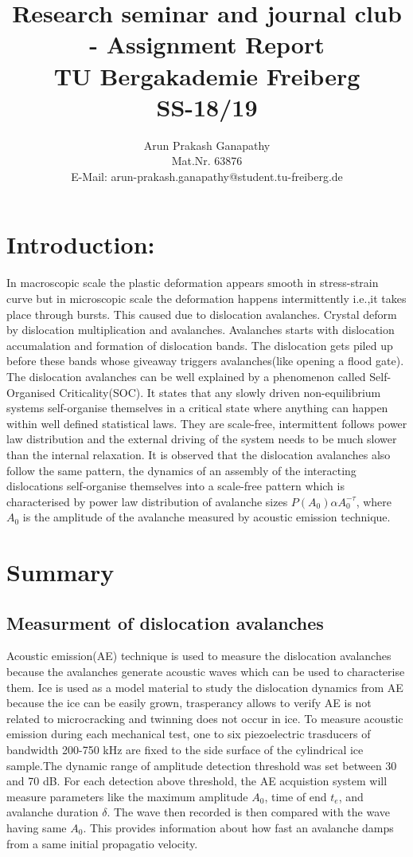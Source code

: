 \documentclass[a4paper,12pt]{article}
\title{\Huge{\textbf{Research seminar and journal club - Assignment Report}}\\[0.5em]\smaller \textbf{TU Bergakademie Freiberg\\SS-18/19}}
\author{Arun Prakash Ganapathy\\
\small{Mat.Nr. 63876}\\
\small{E-Mail: arun-prakash.ganapathy@student.tu-freiberg.de}
}
\date{}
\begin{document}
\maketitle
\newpage

\section{Introduction:}
\indent\indent In macroscopic scale the plastic deformation appears smooth in stress-strain curve but in microscopic scale the deformation happens intermittently i.e.,it takes place through bursts. This caused due to dislocation avalanches. Crystal deform by dislocation multiplication and avalanches. Avalanches starts with dislocation accumalation and formation of dislocation bands. The dislocation gets piled up before these bands whose giveaway triggers avalanches(like opening a flood gate). The dislocation avalanches can be well explained by a phenomenon called Self-Organised Criticality(SOC). It states that  any slowly driven non-equilibrium systems self-organise themselves in a critical state where anything can happen within well defined statistical laws. They are scale-free, intermittent follows power law distribution and the external driving of the system needs to be much slower than the internal relaxation. It is observed that the dislocation avalanches also follow the same pattern, the dynamics of an assembly of the interacting dislocations self-organise themselves into a scale-free pattern which is characterised by power law distribution of avalanche sizes $ P(A_0)  \alpha  A_0^{-\tau} $, where $ A_0 $ is the amplitude of the avalanche measured by acoustic emission technique.
\section{Summary}
\subsection{Measurment of dislocation avalanches}
\indent\indent Acoustic emission(AE) technique is used to measure the dislocation avalanches because the avalanches generate acoustic waves which can be used to characterise them. Ice is used as a model material to study the dislocation dynamics from AE because the ice can be easily grown, trasperancy allows to verify AE is not related to microcracking and twinning does not occur in ice. To measure acoustic emission during each mechanical test, one to six piezoelectric trasducers of bandwidth 200-750 kHz are fixed to the side surface of the cylindrical ice sample.The dynamic range of amplitude detection threshold was set between 30 and 70 dB. For each detection above threshold, the AE acquistion system will measure parameters like the maximum amplitude $A_0$, time of end $ t_e$, and avalanche duration $ \delta $. The wave then recorded is then compared with the wave having same $ A_0 $. This provides information about how fast an avalanche damps from a same initial propagatio velocity.
\end{document}
